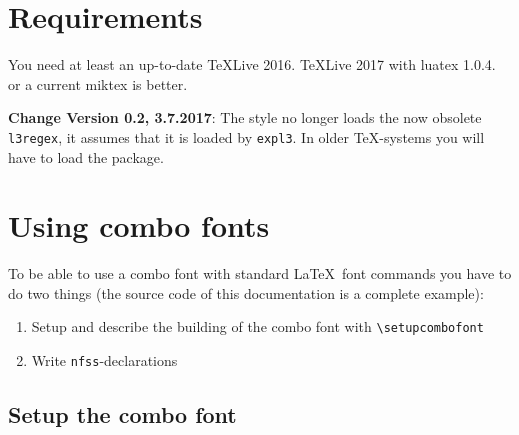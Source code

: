 \documentclass[parskip=half-,egregdoesnotlikesansseriftitles]{scrartcl}
\begin{document}
\section{Requirements}
You need at least an up-to-date TeXLive 2016. TeXLive 2017 with luatex 1.0.4. or a current miktex is better. 

\textbf{Change Version 0.2, 3.7.2017}: The style no longer loads the now obsolete \texttt{l3regex}, it assumes that it is loaded by \texttt{expl3}. In older \TeX-systems you will have to load the package.


\section{Using combo fonts}

To be able to use a combo font with standard \LaTeX\ font commands you have to do two things (the source code of this documentation is a complete example):

\begin{enumerate}
\item Setup and describe the building of the combo font with \verb+\setupcombofont+

\item Write \texttt{nfss}-declarations
\end{enumerate}

\subsection{Setup the combo font}

\DescribeMacro{}
\end{document}
